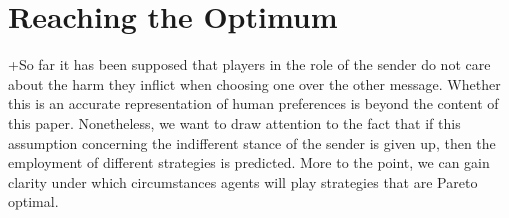 \documentclass[10pt]{article}
\begin{document}
\section{Reaching the Optimum}
+So far it has been supposed that players in the role of the sender do not care about the harm they inflict when choosing one over the other message. Whether this is an accurate representation of human preferences is beyond the content of this paper. Nonetheless, we want to draw attention to the fact that if this assumption concerning the indifferent stance of the sender is given up, then the employment of different strategies is predicted. More to the point, we can gain clarity under which circumstances agents will play strategies that are Pareto optimal.
\end{document}
